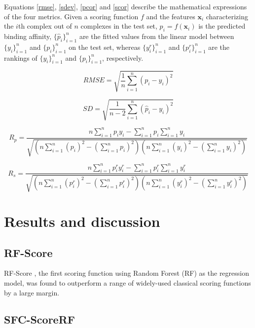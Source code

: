 \documentclass{llncs}
\begin{document}
Equations \ref{rmse}, \ref{sdev}, \ref{pcor} and \ref{scor} describe the mathematical expressions of the four metrics. Given a scoring function $f$ and the features $\mathbf{x}_i$ characterizing the $i$th complex out of $n$ complexes in the test set, $p_i=f(\mathbf{x}_i)$ is the predicted binding affinity, $\{\hat{p}_i\}_{i=1}^n$ are the fitted values from the linear model between $\{y_i\}_{i=1}^n$ and $\{p_i\}_{i=1}^n$ on the test set, whereas $\{y^r_i\}_{i=1}^n$ and $\{p^r_i\}_{i=1}^n$ are the rankings of $\{y_i\}_{i=1}^n$ and $\{p_i\}_{i=1}^n$, respectively.

\begin{equation}
RMSE=\sqrt{\frac{1}{n}\sum_{i=1}^n(p_i-y_i)^2}
\label{rmse}
\end{equation}

\begin{equation}
SD=\sqrt{\frac{1}{n-2}\sum_{i=1}^n(\hat{p}_i-y_i)^2}
\label{sdev}
\end{equation}

\begin{equation}
R_p=\frac{n\sum_{i=1}^np_iy_i-\sum_{i=1}^np_i\sum_{i=1}^ny_i}{\sqrt{(n\sum_{i=1}^n(p_i)^2-(\sum_{i=1}^np_i)^2)(n\sum_{i=1}^n(y_i)^2-(\sum_{i=1}^ny_i)^2)}}
\label{pcor}
\end{equation}

\begin{equation}
R_s=\frac{n\sum_{i=1}^np^r_iy^r_i-\sum_{i=1}^np^r_i\sum_{i=1}^ny^r_i}{\sqrt{(n\sum_{i=1}^n(p^r_i)^2-(\sum_{i=1}^np^r_i)^2)(n\sum_{i=1}^n(y^r_i)^2-(\sum_{i=1}^ny^r_i)^2)}}
\label{scor}
\end{equation}

\section{Results and discussion}

\subsection{RF-Score}

RF-Score \cite{564}, the first scoring function using Random Forest (RF) \cite{1309} as the regression model, was found to outperform a range of widely-used classical scoring functions by a large margin.

\subsection{SFC-ScoreRF}
\end{document}

